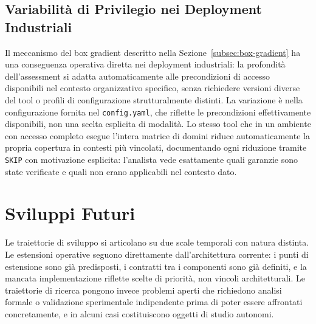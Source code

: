 \subsection{Variabilità di Privilegio nei Deployment Industriali}\label{subsec:privilegio-deployment}

Il meccanismo del box gradient descritto nella Sezione~\ref{subsec:box-gradient} ha una conseguenza operativa diretta nei deployment industriali: la profondità dell'assessment si adatta automaticamente alle precondizioni di accesso disponibili nel contesto organizzativo specifico, senza richiedere versioni diverse del tool o profili di configurazione strutturalmente distinti. La variazione è nella configurazione fornita nel \texttt{config.yaml}, che riflette le precondizioni effettivamente disponibili, non una scelta esplicita di modalità. Lo stesso tool che in un ambiente con accesso completo esegue l'intera matrice di domini riduce automaticamente la propria copertura in contesti più vincolati, documentando ogni riduzione tramite \texttt{SKIP} con motivazione esplicita: l'analista vede esattamente quali garanzie sono state verificate e quali non erano applicabili nel contesto dato.


































\section{Sviluppi Futuri}%
\label{sec:sviluppi-futuri}

Le traiettorie di sviluppo si articolano su due scale temporali con natura distinta. Le estensioni operative seguono direttamente dall'architettura corrente: i punti di estensione sono già predisposti, i contratti tra i componenti sono già definiti, e la mancata implementazione riflette scelte di priorità, non vincoli architetturali. Le traiettorie di ricerca pongono invece problemi aperti che richiedono analisi formale o validazione sperimentale indipendente prima di poter essere affrontati concretamente, e in alcuni casi costituiscono oggetti di studio autonomi.


